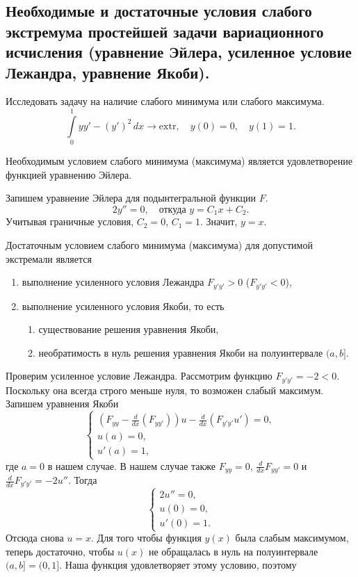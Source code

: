 \subsection{Необходимые и достаточные условия слабого экстремума простейшей задачи вариационного исчисления (уравнение Эйлера, усиленное условие Лежандра, уравнение Якоби).}
\begin{example}
  Исследовать задачу на наличие слабого минимума или слабого максимума. 
  \[
    \int\limits_{0}^{1} yy' - (y')^2\,dx \to \mathrm{extr}, \quad y(0) = 0,
    \quad y(1) = 1.
  \]
\begin{solution}
Необходимым условием слабого минимума (максимума) является удовлетворение
функцией
уравнению Эйлера.


  Запишем уравнение Эйлера для подынтегральной функции $ F $.  
  \[
    2y'' = 0, \quad \text{откуда } y = C_1 x + C_2.
  \]
 Учитывая граничные условия, $ C_2 = 0 $, $ C_1 = 1 $. Значит, $ y = x $. 

Достаточным условием слабого минимума (максимума) для допустимой экстремали является 
\begin{enumerate}
  \item выполнение усиленного условия Лежандра $ F_{y'y'} > 0 $ ($ F_{y'y'} < 0
    $),
  \item выполнение усиленного условия Якоби, то есть
    \begin{enumerate}
      \item существование решения уравнения Якоби,
      \item необратимость в нуль решения уравнения Якоби на полуинтервале $ (a,
        b]$.
    \end{enumerate}
\end{enumerate}


 Проверим усиленное условие Лежандра. Рассмотрим функцию $ F_{y'y'} = -2 < 0 $. Поскольку она всегда строго
 меньше нуля, то возможен слабый максимум. Запишем уравнения Якоби 
 \[
   \begin{cases}
     \left( F_{yy} - \frac{d}{dx} \left( F_{yy'} \right)  \right) u - \frac{d}{dx}
     \left( F_{y'y'} u' \right) = 0,\\
     u(a) = 0,\\
     u'(a) = 1,
   \end{cases}
 \]
 где $ a = 0 $ в нашем случае. В нашем случае также $ F_{yy} = 0 $, $
 \frac{d}{dx} F_{yy'} = 0 $ и $ \frac{d}{dx}F_{y'y'} = -2u'' $. Тогда  
 \[
     \begin{cases}
       2u'' =0, \\
       u(0) = 0,\\
       u'(0) = 1.
     \end{cases}
 \]
Отсюда снова $ u = x $. Для того чтобы функция $ y(x) $ была слабым максимумом,
теперь достаточно, чтобы $ u(x) $ не обращалась в нуль на полуинтервале $ (a, b] =
(0, 1] $. Наша функция удовлетворяет этому условию, поэтому  


\end{solution}
\end{example}

